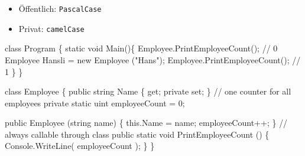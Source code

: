 \documentclass[
  9pt,
  a4paperpaper,
  DIV=11]{scrartcl}
\newenvironment{Shaded}{}{}
\newcommand{\CommentTok}[1]{\textcolor[rgb]{0.42,0.45,0.49}{#1}}
\newcommand{\DataTypeTok}[1]{\textcolor[rgb]{0.84,0.23,0.29}{#1}}
\newcommand{\DecValTok}[1]{\textcolor[rgb]{0.00,0.36,0.77}{#1}}
\newcommand{\FunctionTok}[1]{\textcolor[rgb]{0.44,0.26,0.76}{#1}}
\newcommand{\KeywordTok}[1]{\textcolor[rgb]{0.84,0.23,0.29}{#1}}
\newcommand{\NormalTok}[1]{\textcolor[rgb]{0.14,0.16,0.18}{#1}}
\newcommand{\OperatorTok}[1]{\textcolor[rgb]{0.14,0.16,0.18}{#1}}
\newcommand{\StringTok}[1]{\textcolor[rgb]{0.01,0.18,0.38}{#1}}
\providecommand{\tightlist}{%
  \setlength{\itemsep}{0pt}\setlength{\parskip}{0pt}}\usepackage{longtable,booktabs,array}
\numberwithin{equation}{section}
\begin{document}
\begin{multicols}{2}
\begin{tcolorbox}
\begin{tcolorbox}
\begin{tcolorbox}
\begin{tcolorbox}[enhanced jigsaw, colbacktitle=quarto-callout-caution-color!10!white, colback=white, rightrule=.15mm, title=\textcolor{quarto-callout-caution-color}{\faFire}\hspace{0.5em}{Namensgebung statischer Variablen}, opacityback=0, arc=.35mm, coltitle=black, opacitybacktitle=0.6, breakable, bottomtitle=1mm, toptitle=1mm, colframe=quarto-callout-caution-color-frame, bottomrule=.15mm, titlerule=0mm, left=2mm, leftrule=.75mm, toprule=.15mm]

\begin{itemize}
\tightlist
\item
  Öffentlich: \texttt{PascalCase}
\item
  Privat: \texttt{camelCase}
\end{itemize}

\end{tcolorbox}

\begin{Shaded}
\begin{Highlighting}[]
\KeywordTok{class}\NormalTok{ Program }\OperatorTok{\{}
  \KeywordTok{static} \DataTypeTok{void} \FunctionTok{Main}\OperatorTok{()\{}
\NormalTok{    Employee}\OperatorTok{.}\FunctionTok{PrintEmployeeCount}\OperatorTok{();}  \CommentTok{// 0}
\NormalTok{    Employee Hansli }\OperatorTok{=} \KeywordTok{new} \FunctionTok{Employee} \OperatorTok{(}\StringTok{"Hans"}\OperatorTok{);}
\NormalTok{    Employee}\OperatorTok{.}\FunctionTok{PrintEmployeeCount}\OperatorTok{();}  \CommentTok{// 1}
  \OperatorTok{\}}
\OperatorTok{\}}

\KeywordTok{class}\NormalTok{ Employee }\OperatorTok{\{}
  \KeywordTok{public} \DataTypeTok{string}\NormalTok{ Name }\OperatorTok{\{} \KeywordTok{get}\OperatorTok{;} \KeywordTok{private} \KeywordTok{set}\OperatorTok{;} \OperatorTok{\}}
  \CommentTok{// one counter for all employees}
  \KeywordTok{private} \KeywordTok{static} \DataTypeTok{uint}\NormalTok{ employeeCount }\OperatorTok{=} \DecValTok{0}\OperatorTok{;}

  \KeywordTok{public} \FunctionTok{Employee} \OperatorTok{(}\DataTypeTok{string}\NormalTok{ name}\OperatorTok{)} \OperatorTok{\{}
    \KeywordTok{this}\OperatorTok{.}\FunctionTok{Name} \OperatorTok{=}\NormalTok{ name}\OperatorTok{;}
\NormalTok{    employeeCount}\OperatorTok{++;}
  \OperatorTok{\}}
  \CommentTok{// always callable through class}
  \KeywordTok{public} \KeywordTok{static} \DataTypeTok{void} \FunctionTok{PrintEmployeeCount} \OperatorTok{()} \OperatorTok{\{}
\NormalTok{    Console}\OperatorTok{.}\FunctionTok{WriteLine}\OperatorTok{(}\NormalTok{ employeeCount }\OperatorTok{);}
  \OperatorTok{\}}
\OperatorTok{\}}
\end{Highlighting}
\end{Shaded}


\end{tcolorbox}
\end{tcolorbox}
\end{tcolorbox}
\end{multicols}
\end{document}
